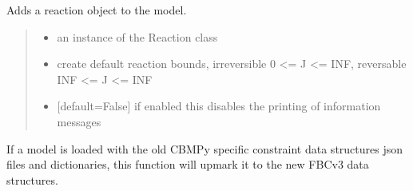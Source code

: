 \documentclass[letterpaper,12pt,english]{sphinxmanual}
\begin{document}
\begin{fulllineitems}
\begin{fulllineitems}
\label{\detokenize{api/core:cbmpy.CBModel.Model.addReaction}}
\pysigstartsignatures
\pysiglinewithargsret
{}
{\sphinxparamcomma {}\sphinxparamcomma {}}
{}
\pysigstopsignatures
\sphinxAtStartPar
Adds a reaction object to the model.
\begin{quote}\begin{description}
\begin{itemize}
\item {} 
\sphinxAtStartPar
{} \textendash{} an instance of the Reaction class

\item {} 
\sphinxAtStartPar
{} \textendash{} create default reaction bounds, irreversible 0 \textless{}= J \textless{}= INF, reversable \sphinxhyphen{}INF \textless{}= J \textless{}= INF

\item {} 
\sphinxAtStartPar
{} \textendash{} {[}default=False{]} if enabled this disables the printing of information messages

\end{itemize}

\end{description}\end{quote}

\end{fulllineitems}


\begin{fulllineitems}
\label{\detokenize{api/core:cbmpy.CBModel.Model.convertUserConstraintsToUserDefinedConstraints}}
\pysigstartsignatures
\pysiglinewithargsret
{}
{}
{}
\pysigstopsignatures
\sphinxAtStartPar
If a model is loaded with the old CBMPy specific constraint data structures
json files and dictionaries, this function will upmark it to the new FBCv3 data
structures.


\end{fulllineitems}
\end{fulllineitems}
\end{document}
